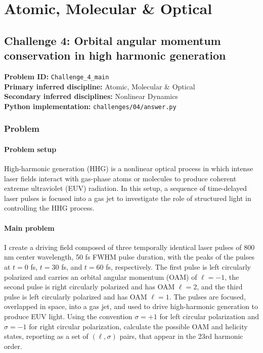 \section{Atomic, Molecular \& Optical}
\subsection[Challenge 4: Orbital angular momentum conservation in high harmonic generation]{Challenge 4: Orbital angular momentum conservation in high harmonic generation}
\textbf{Problem ID:} \texttt{Challenge\_4\_main}\\
\textbf{Primary inferred discipline:} Atomic, Molecular \& Optical\\
\textbf{Secondary inferred disciplines:} Nonlinear Dynamics\\
\textbf{Python implementation:} \texttt{challenges/04/answer.py}

\subsubsection*{Problem}
\paragraph*{Problem setup}
High-harmonic generation (HHG) is a nonlinear optical process in which intense laser fields interact with gas-phase atoms or molecules to produce coherent extreme ultraviolet (EUV) radiation. In this setup, a sequence of time-delayed laser pulses is focused into a gas jet to investigate the role of structured light in controlling the HHG process.

\paragraph*{Main problem}

I create a driving field composed of three temporally identical laser pulses of 800 nm center wavelength, 50 fs FWHM pulse duration, with the peaks of the pulses at $t = 0$ fs, $t = 30$ fs, and $t = 60$ fs, respectively. The first pulse is left circularly polarized and carries an orbital angular momentum (OAM) of $\ell = -1$, the second pulse is right circularly polarized and has OAM $\ell = 2$, and the third pulse is left circularly polarized and has OAM $\ell = 1$. The pulses are focused, overlapped in space, into a gas jet, and used to drive high-harmonic generation to produce EUV light. Using the convention $\sigma = +1$ for left circular polarization and $\sigma = -1$ for right circular polarization, calculate the possible OAM and helicity states, reporting as a set of $(\ell, \sigma)$ pairs, that appear in the 23rd harmonic order.
